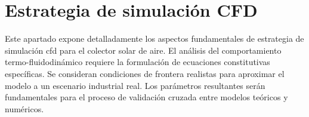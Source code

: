 \section{Estrategia de simulación CFD}
\label{sec:cap04_estrategia_cfd}

Este apartado expone detalladamente los aspectos fundamentales de estrategia de simulación cfd para el colector solar de aire.
El análisis del comportamiento termo-fluidodinámico requiere la formulación de ecuaciones constitutivas específicas.
Se consideran condiciones de frontera realistas para aproximar el modelo a un escenario industrial real.
Los parámetros resultantes serán fundamentales para el proceso de validación cruzada entre modelos teóricos y numéricos.
